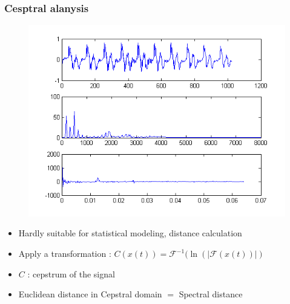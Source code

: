 \documentclass[11pt,english]{beamer}
\begin{document}
\begin{frame}
  \frametitle{Cesptral alanysis}
    \begin{figure}
    \centering
    \includegraphics[trim={0 7.2cm 0 0}, clip, scale = 0.8]{cepstre.png}
    \end{figure}
      
    \begin{itemize}
    \item Hardly suitable for statistical modeling, distance calculation
    \item Apply a transformation :
    $ C(x(t)) = \mathcal{F}^{-1}(\ln(|\mathcal{F}(x(t))|)  $
    \item $C$ : cepstrum of the signal
    \item Euclidean distance in Cepstral domain $=$ Spectral distance 
    \end{itemize}
  
\end{frame}
\end{document}
